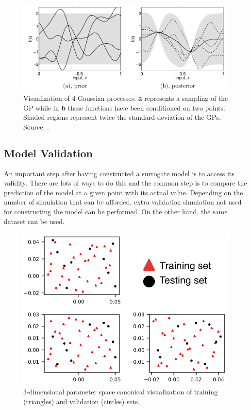 \begin{figure}[!h]
\centering
\includegraphics[width=0.9\linewidth,keepaspectratio]{fig/literature/rasmussenGP.png}
\caption{Visualization of 4 Gaussian processes: \textbf{a} represents a sampling of the GP while in \textbf{b} these functions have been conditioned on two points. Shaded regions represent twice the standard deviation of the GPs. Source: \cite{rasmussen2006}.}
\label{fig:gp_prior-post}
\end{figure}



\subsection{Model Validation}\label{sec:validation}

An important step after having constructed a surrogate model is to access its validity. There are lots of ways to do this and the common step is to compare the prediction of the model at a given point with its actual value. Depending on the number of simulation that can be afforded, extra validation simulation not used for constructing the model can be performed. On the other hand, the same dataset can be used.

\begin{figure}[!h]
\centering
\includegraphics[width=0.6\linewidth,keepaspectratio]{fig/literature/validation_set.png}
\caption{3-dimensional parameter space canonical visualization of training (triangles) and validation (circles) sets.}
\label{fig:validation}
\end{figure}

